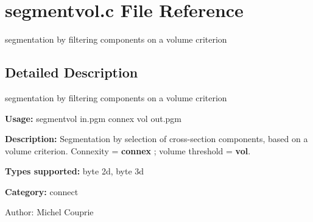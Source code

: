\section{segmentvol.c File Reference}
\label{segmentvol_8c}
segmentation by filtering components on a volume criterion 



\subsection{Detailed Description}
segmentation by filtering components on a volume criterion 

{\bf Usage:} segmentvol in.pgm connex vol out.pgm

{\bf Description:} Segmentation by selection of cross-section components, based on a volume criterion. Connexity = {\bf connex} ; volume threshold = {\bf vol}.

{\bf Types supported:} byte 2d, byte 3d

{\bf Category:} connect

\begin{Desc}
\item[Author:]Michel Couprie \end{Desc}

